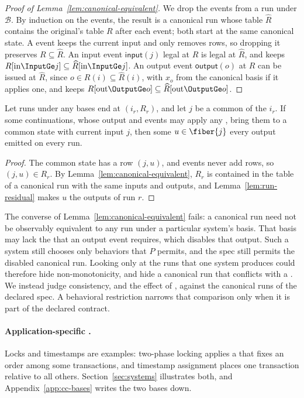 \begin{proof}[Proof of Lemma~\ref{lem:canonical-equivalent}]
We drop the \commitment events from a run under $\mathcal B$.  By induction on
the events, the result is a canonical run whose table $\widehat R$ contains
the original's table $R$ after each event; both start at the same canonical
state.  A \commitment event keeps the current input and only removes rows, so
dropping it preserves $R\subseteq\widehat R$.  An input event
$\mathsf{input}(j)$ legal at $R$ is legal at $\widehat R$, and keeps
$R[\mathrm{in}\InputGe j]\subseteq\widehat R[\mathrm{in}\InputGe j]$.  An
output event $\mathsf{output}(o)$ at $R$ can be issued at $\widehat R$, since
$o\in R(i)\subseteq\widehat R(i)$, with $x_o$ from the canonical basis if it
applies one, and keeps
$R[\mathrm{out}\OutputGe o]\subseteq\widehat R[\mathrm{out}\OutputGe o]$.
\end{proof}

\begin{corollary}
\label{cor:reconciliation-any-basis}
Let runs under any \commitment bases end at $(i_r,R_r)$, and let $j$ be a
common \indesc of the $i_r$.  If some continuations, whose output and \commitment events
may apply any \commitments, bring them to a common state with current input $j$,
then some $u\in\fiber{j}$ \outrel every output emitted on every run.
\end{corollary}

\begin{proof}
The common state has a row $(j,u)$, and events never add rows, so
$(j,u)\in R_r$.  By Lemma~\ref{lem:canonical-equivalent}, $R_r$ is contained in
the table of a canonical run with the same inputs and outputs, and
Lemma~\ref{lem:run-residual} makes $u$ \outrel the outputs of run $r$.
\end{proof}

The converse of Lemma~\ref{lem:canonical-equivalent} fails: a canonical run
need not be observably equivalent to any run under a particular system's
basis.  That basis may lack the \commitment that an output event requires,
which disables that output.  Such a system still chooses only behaviors that
$P$ permits, and the spec still permits the disabled canonical run.  Looking
only at the runs that one system produces could therefore hide
non-monotonicity, and hide a canonical run that conflicts with a \commitment.
We instead judge consistency, and the effect of \commitments, against the
canonical runs of the declared spec.  A behavioral restriction narrows that
comparison only when it is part of the declared contract.

\paragraph{Application-specific \commitments.}
Locks and timestamps are examples: two-phase locking applies a \commitment
that fixes an order among some transactions, and timestamp assignment places
one transaction relative to all others.  Section~\ref{sec:systems} illustrates both, and
Appendix~\ref{app:cc-bases} writes the two bases down.
